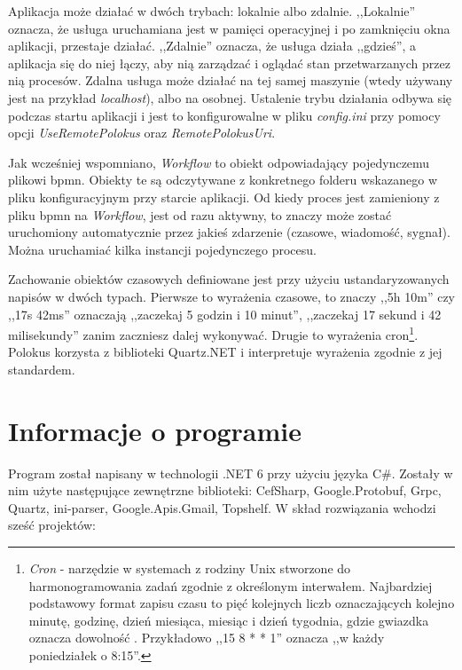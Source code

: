 \documentclass[declaration,shortabstract,mgr]{iithesis}
\begin{document}
Aplikacja może działać w dwóch trybach: lokalnie albo zdalnie. ,,Lokalnie'' oznacza, że usługa uruchamiana jest w pamięci operacyjnej i po zamknięciu okna aplikacji, przestaje działać. ,,Zdalnie'' oznacza, że usługa działa ,,gdzieś'', a aplikacja się do niej łączy, aby nią zarządzać i oglądać stan przetwarzanych przez nią procesów. Zdalna usługa może działać na tej samej maszynie (wtedy używany jest na przykład \textit{localhost}), albo na osobnej. Ustalenie trybu działania odbywa się podczas startu aplikacji i jest to konfigurowalne w pliku \emph{config.ini} przy pomocy opcji \textit{UseRemotePolokus} oraz \textit{RemotePolokusUri}.

Jak wcześniej wspomniano, \textit{Workflow} to obiekt odpowiadający pojedynczemu plikowi bpmn. Obiekty te są odczytywane z konkretnego folderu wskazanego w pliku konfiguracyjnym przy starcie aplikacji. Od kiedy proces jest zamieniony z pliku bpmn na \textit{Workflow}, jest od razu aktywny, to znaczy może zostać uruchomiony automatycznie przez jakieś zdarzenie (czasowe, wiadomość, sygnał). Można uruchamiać kilka instancji pojedynczego procesu.

Zachowanie obiektów czasowych definiowane jest przy użyciu ustandaryzowanych napisów w dwóch typach. Pierwsze to wyrażenia czasowe, to znaczy ,,5h 10m'' czy ,,17s 42ms'' oznaczają ,,zaczekaj 5 godzin i 10 minut'', ,,zaczekaj 17 sekund i 42 milisekundy'' zanim zaczniesz dalej wykonywać. Drugie to wyrażenia cron\footnote{\textit{Cron} - narzędzie w systemach z rodziny Unix stworzone do harmonogramowania zadań zgodnie z określonym interwałem. Najbardziej podstawowy format zapisu czasu to pięć kolejnych liczb oznaczających kolejno minutę, godzinę, dzień miesiąca, miesiąc i dzień tygodnia, gdzie gwiazdka oznacza dowolność \cite{wiki-cron}. Przykładowo ,,15 8 * * 1'' oznacza ,,w każdy poniedziałek o 8:15''.}. Polokus korzysta z biblioteki Quartz.NET i interpretuje wyrażenia zgodnie z jej standardem.

\section{Informacje o programie}

Program został napisany w technologii .NET 6 przy użyciu języka C\#. Zostały w nim użyte następujące zewnętrzne biblioteki: CefSharp, Google.Protobuf, Grpc, Quartz, ini-parser, Google.Apis.Gmail, Topshelf. W skład rozwiązania wchodzi sześć projektów:
\end{document}
